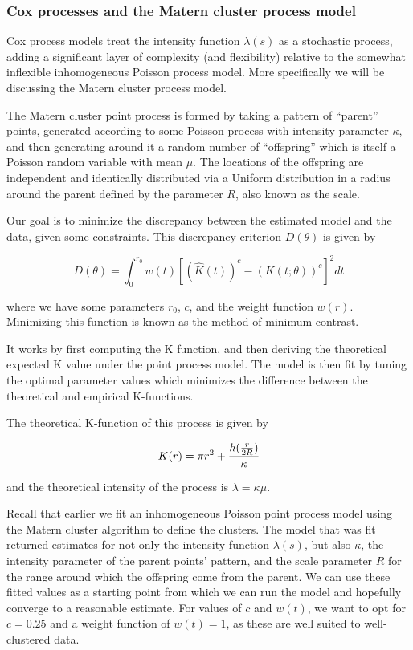 \documentclass[
  12pt,
]{article}
\begin{document}
\hypertarget{cox-processes-and-the-matern-cluster-process-model}{%
\subsubsection{Cox processes and the Matern cluster process
model}\label{cox-processes-and-the-matern-cluster-process-model}}

Cox process models treat the intensity function \(\lambda(s)\) as a
stochastic process, adding a significant layer of complexity (and
flexibility) relative to the somewhat inflexible inhomogeneous Poisson
process model. More specifically we will be discussing the Matern
cluster process model.

The Matern cluster point process is formed by taking a pattern of
``parent'' points, generated according to some Poisson process with
intensity parameter \(\kappa\), and then generating around it a random
number of ``offspring'' which is itself a Poisson random variable with
mean \(\mu\). The locations of the offspring are independent and
identically distributed via a Uniform distribution in a radius around
the parent defined by the parameter \(R\), also known as the scale.

Our goal is to minimize the discrepancy between the estimated model and
the data, given some constraints. This discrepancy criterion
\(D(\theta)\) is given by

\[D(\theta) = \int_0^{r_0} w(t)[(\hat K(t))^c - (K(t;\theta))^c]^2 dt\]

where we have some parameters \(r_0\), \(c\), and the weight function
\(w(r)\). Minimizing this function is known as the method of minimum
contrast.

It works by first computing the K function, and then deriving the
theoretical expected K value under the point process model. The model is
then fit by tuning the optimal parameter values which minimizes the
difference between the theoretical and empirical K-functions.

The theoretical K-function of this process is given by

\[K(r) = \pi r^2 + \frac{h\large(\frac{r}{2R}\large)}{\kappa}\]

and the theoretical intensity of the process is
\(\lambda = \kappa \mu\).

Recall that earlier we fit an inhomogeneous Poisson point process model
using the Matern cluster algorithm to define the clusters. The model
that was fit returned estimates for not only the intensity function
\(\lambda(s)\), but also \(\kappa\), the intensity parameter of the
parent points' pattern, and the scale parameter \(R\) for the range
around which the offspring come from the parent. We can use these fitted
values as a starting point from which we can run the model and hopefully
converge to a reasonable estimate. For values of \(c\) and \(w(t)\), we
want to opt for \(c=0.25\) and a weight function of \(w(t) = 1\), as
these are well suited to well-clustered data.
\end{document}
